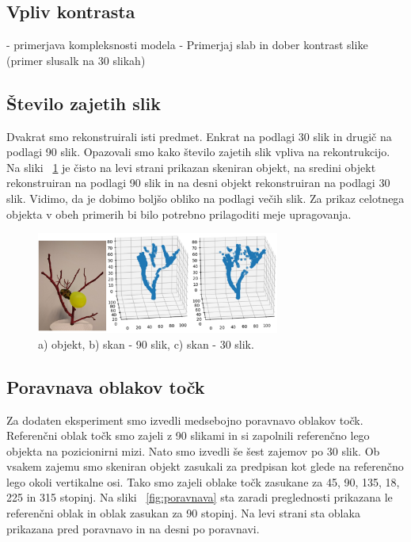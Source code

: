 \documentclass[journal,a4paper,twoside]{sty/IEEEtran}
\begin{document}
\subsection{Vpliv kontrasta}
-  primerjava kompleksnosti modela
-  Primerjaj slab in dober kontrast slike (primer slusalk na 30 slikah)


\subsection{Število zajetih slik}
Dvakrat smo rekonstruirali isti predmet. Enkrat na podlagi 30 slik in drugič na podlagi 90 slik. Opazovali smo kako število zajetih slik vpliva na rekontrukcijo. Na sliki ~\ref{fig:slika_90_30} je čisto na levi strani prikazan skeniran objekt, na sredini objekt rekonstruiran na podlagi 90 slik in na desni objekt rekonstruiran na podlagi 30 slik. Vidimo, da je dobimo boljšo obliko na podlagi večih slik. Za prikaz celotnega objekta v obeh primerih bi bilo potrebno prilagoditi meje upragovanja. 
%
\begin{figure}[H]
	\centerline{\includegraphics[width=8cm]{fig/slika_90_30}}
	\caption{a) objekt, b) skan - 90 slik, c) skan - 30 slik.}
	\label{fig:slika_90_30}
\end{figure}
%
%
\subsection{Poravnava oblakov točk}
Za dodaten eksperiment smo izvedli medsebojno poravnavo oblakov točk. Referenčni oblak točk smo zajeli z 90 slikami in si zapolnili referenčno lego objekta na pozicionirni mizi. Nato smo izvedli še šest zajemov po 30 slik. Ob vsakem zajemu smo skeniran objekt zasukali za predpisan kot glede na referenčno lego okoli vertikalne osi. Tako smo zajeli oblake točk zasukane za 45, 90, 135, 18, 225 in 315 stopinj. Na sliki ~\ref{fig:poravnava} sta zaradi preglednosti prikazana le referenčni oblak in oblak zasukan za 90 stopinj. Na levi strani sta oblaka prikazana pred poravnavo in na desni po poravnavi. 
\end{document}
